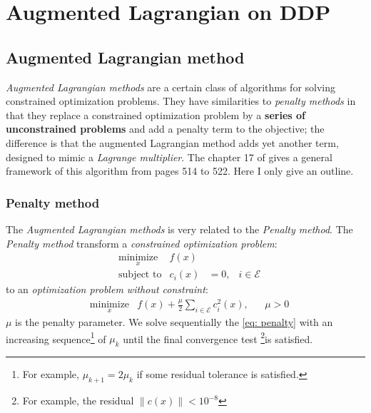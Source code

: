 \documentclass{report}
\begin{document}
\chapter{Augmented Lagrangian on DDP}
\section{Augmented Lagrangian method}
\emph{Augmented Lagrangian methods} are a certain class of algorithms for solving constrained optimization problems. They have similarities to \emph{penalty methods} in that they replace a constrained optimization problem by a \textbf{series of unconstrained problems} and add a penalty term to the objective; the difference is that the augmented Lagrangian method adds yet another term, designed to mimic a \emph{Lagrange multiplier}. The chapter 17 of \cite{NoceWrig06} gives a general framework of this algorithm from pages 514 to 522. Here I only give an outline.

\subsection{Penalty method}
The \emph{Augmented Lagrangian methods} is very related to the \emph{Penalty method}. The \emph{Penalty method} transform a \emph{constrained optimization problem}:
\begin{equation}
\begin{aligned}	
&\underset{x}{\text{minimize}}                  &f(x) &  & \\
&\text{subject to}     & c_i(x)  &= 0,  & i \in \mathcal{E}
\end{aligned}
\end{equation}
to an \emph{optimization problem without constraint}:
\begin{equation}
\label{eq: penalty}
\begin{aligned}	
&\underset{x}{\text{minimize}}       &f(x) + \frac{\mu}{2} \sum_{i \in \mathcal{E}} c_i^2(x),&  &\mu >0
\end{aligned}
\end{equation}
$\mu$ is the penalty parameter. We solve sequentially the \ref{eq: penalty} with an increasing sequence\footnote{For example, $\mu_{k+1} = 2 \mu_k$ if some residual tolerance is satisfied.} of $\mu_k$ until the final convergence test \footnote{For example, the residual $\|c(x)\| < 10^{-8}$}is satisfied.
\end{document}
